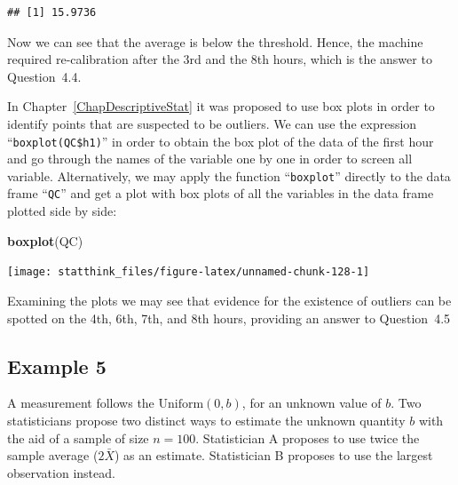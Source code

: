 \documentclass[]{krantz}
\makeatletter
\newenvironment{Shaded}{\begin{snugshade}}{\end{snugshade}}
\newcommand{\KeywordTok}[1]{\textcolor[rgb]{0.13,0.29,0.53}{\textbf{#1}}}
\newcommand{\NormalTok}[1]{#1}
\newcommand{\OperatorTok}[1]{\textcolor[rgb]{0.81,0.36,0.00}{\textbf{#1}}}
\newenvironment{kframe}{%
\medskip{}
\setlength{\fboxsep}{.8em}
 \def\at@end@of@kframe{}%
 \ifinner\ifhmode%
  \def\at@end@of@kframe{\end{minipage}}%
  \begin{minipage}{\columnwidth}%
 \fi\fi%
 \def\FrameCommand##1{\hskip\@totalleftmargin \hskip-\fboxsep
 \colorbox{shadecolor}{##1}\hskip-\fboxsep
     \hskip-\linewidth \hskip-\@totalleftmargin \hskip\columnwidth}%
 \MakeFramed {\advance\hsize-\width
   \@totalleftmargin\z@ \linewidth\hsize
   \@setminipage}}%
 {\par\unskip\endMakeFramed%
 \at@end@of@kframe}
\renewenvironment{Shaded}{\begin{kframe}}{\end{kframe}}
\theoremstyle{definition}
\theoremstyle{definition}
\theoremstyle{definition}
\theoremstyle{remark}
\makeatother
\begin{document}
\begin{Shaded}
\end{Shaded}

\begin{verbatim}
## [1] 15.9736
\end{verbatim}

Now we can see that the average is below the threshold. Hence, the
machine required re-calibration after the 3rd and the 8th hours, which
is the answer to Question~4.4.

In Chapter~\ref{ChapDescriptiveStat} it was proposed to use box plots in
order to identify points that are suspected to be outliers. We can use
the expression ``\texttt{boxplot(QC\$h1)}'' in order to obtain the box plot of the
data of the first hour and go through the names of the variable one by
one in order to screen all variable. Alternatively, we may apply the
function ``\texttt{boxplot}'' directly to the data frame ``\texttt{QC}'' and get a plot
with box plots of all the variables in the data frame plotted side by
side:

\begin{Shaded}
\begin{Highlighting}[]
\KeywordTok{boxplot}\NormalTok{(QC)}
\end{Highlighting}
\end{Shaded}

\begin{center}\texttt{[image: statthink\_files/figure-latex/unnamed-chunk-128-1]} \end{center}

Examining the plots we may see that evidence for the existence of
outliers can be spotted on the 4th, 6th, 7th, and 8th hours, providing
an answer to Question~4.5

\hypertarget{example-5}{%
\subsection{Example 5}\label{example-5}}

A measurement follows the \(\mbox{Uniform}(0,b)\), for an unknown value of
\(b\). Two statisticians propose two distinct ways to estimate the unknown
quantity \(b\) with the aid of a sample of size \(n=100\). Statistician A
proposes to use twice the sample average (\(2 \bar X\)) as an estimate.
Statistician B proposes to use the largest observation instead.
\end{document}
